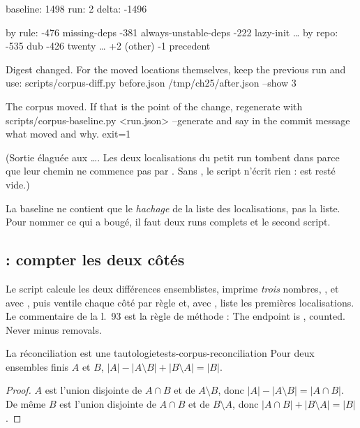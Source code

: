 \begin{sortie}
baseline: 1498
run:      2
delta:    -1496

by rule:
   -476  missing-deps
   -381  always-unstable-deps
   -222  lazy-init
   …
by repo:
   -535  dub
   -426  twenty
   …
     +2  (other)
     -1  precedent

Digest changed. For the moved locations themselves, keep the previous
run and use: scripts/corpus-diff.py before.json /tmp/ch25/after.json --show 3

The corpus moved. If that is the point of the change, regenerate with
  scripts/corpus-baseline.py <run.json> --generate
and say in the commit message what moved and why.
exit=1
\end{sortie}
\noindent(Sortie élaguée aux \og …\fg{}. Les deux localisations du petit run tombent dans  parce que leur chemin ne commence pas par . Sans , le script n'écrit rien :  est resté vide.)

La baseline ne contient que le \emph{hachage} de la liste des localisations, pas la liste. Pour nommer ce qui a bougé, il faut deux runs complets et le second script.

\subsection{ : compter les deux côtés}


Le script calcule les deux différences ensemblistes, imprime \emph{trois} nombres, ,  et  avec , puis ventile chaque côté par règle et, avec , liste les premières localisations. Le commentaire de la l.~93 est la règle de méthode : \og The endpoint is , counted. Never  minus removals.\fg{}

\begin{proposition}{La réconciliation est une tautologie}{tests-corpus-reconciliation}
Pour deux ensembles finis $A$ et $B$, $|A| - |A \setminus B| + |B \setminus A| = |B|$.
\end{proposition}
\begin{proof}
$A$ est l'union disjointe de $A \cap B$ et de $A \setminus B$, donc $|A| - |A\setminus B| = |A \cap B|$. De même $B$ est l'union disjointe de $A \cap B$ et de $B \setminus A$, donc $|A\cap B| + |B \setminus A| = |B|$.
\end{proof}

